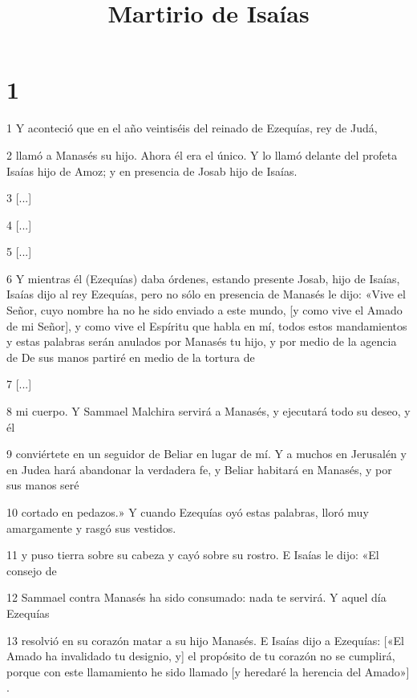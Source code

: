 

\title{Martirio de Isaías}

\chapter{1}

\par 1 Y aconteció que en el año veintiséis del reinado de Ezequías, rey de Judá,

\par 2 llamó a Manasés su hijo. Ahora él era el único. Y lo llamó delante del profeta Isaías hijo de Amoz; y en presencia de Josab hijo de Isaías.

\par 3 [...]

\par 4 [...]

\par 5 [...]

\par 6 Y mientras él (Ezequías) daba órdenes, estando presente Josab, hijo de Isaías, Isaías dijo al rey Ezequías, pero no sólo en presencia de Manasés le dijo: «Vive el Señor, cuyo nombre ha no he sido enviado a este mundo, [y como vive el Amado de mi Señor], y como vive el Espíritu que habla en mí, todos estos mandamientos y estas palabras serán anulados por Manasés tu hijo, y por medio de la agencia de De sus manos partiré en medio de la tortura de

\par 7 [...]

\par 8 mi cuerpo. Y Sammael Malchira servirá a Manasés, y ejecutará todo su deseo, y él

\par 9 conviértete en un seguidor de Beliar en lugar de mí. Y a muchos en Jerusalén y en Judea hará abandonar la verdadera fe, y Beliar habitará en Manasés, y por sus manos seré

\par 10 cortado en pedazos.» Y cuando Ezequías oyó estas palabras, lloró muy amargamente y rasgó sus vestidos.

\par 11 y puso tierra sobre su cabeza y cayó sobre su rostro. E Isaías le dijo: «El consejo de

\par 12 Sammael contra Manasés ha sido consumado: nada te servirá. Y aquel día Ezequías

\par 13 resolvió en su corazón matar a su hijo Manasés. E Isaías dijo a Ezequías: [«El Amado ha invalidado tu designio, y] el propósito de tu corazón no se cumplirá, porque con este llamamiento he sido llamado [y heredaré la herencia del Amado»] .

